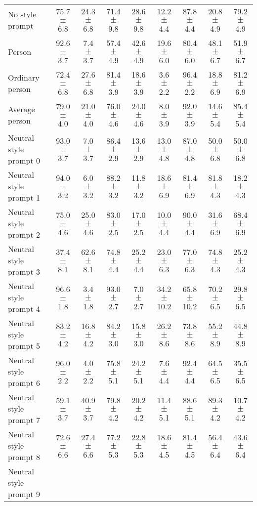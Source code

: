 \begin{table*}[p]
{\begin{tabular}{l|cc|cc|cc|cc}
No style prompt
& 75.7 $\pm$ 6.8 & 24.3 $\pm$ 6.8
& 71.4 $\pm$ 9.8 & 28.6 $\pm$ 9.8
& 12.2 $\pm$ 4.4 & 87.8 $\pm$ 4.4
& 20.8 $\pm$ 4.9 & 79.2 $\pm$ 4.9
\\
Person
& 92.6 $\pm$ 3.7 & 7.4 $\pm$ 3.7
& 57.4 $\pm$ 4.9 & 42.6 $\pm$ 4.9
& 19.6 $\pm$ 6.0 & 80.4 $\pm$ 6.0
& 48.1 $\pm$ 6.7 & 51.9 $\pm$ 6.7
\\
Ordinary person
& 72.4 $\pm$ 6.8 & 27.6 $\pm$ 6.8
& 81.4 $\pm$ 3.9 & 18.6 $\pm$ 3.9
& 3.6 $\pm$ 2.2 & 96.4 $\pm$ 2.2
& 18.8 $\pm$ 6.9 & 81.2 $\pm$ 6.9
\\
Average person
& 79.0 $\pm$ 4.0 & 21.0 $\pm$ 4.0
& 76.0 $\pm$ 4.6 & 24.0 $\pm$ 4.6
& 8.0 $\pm$ 3.9 & 92.0 $\pm$ 3.9
& 14.6 $\pm$ 5.4 & 85.4 $\pm$ 5.4
\\
Neutral style prompt 0
& 93.0 $\pm$ 3.7 & 7.0 $\pm$ 3.7
& 86.4 $\pm$ 2.9 & 13.6 $\pm$ 2.9
& 13.0 $\pm$ 4.8 & 87.0 $\pm$ 4.8
& 50.0 $\pm$ 6.8 & 50.0 $\pm$ 6.8
\\
Neutral style prompt 1
& 94.0 $\pm$ 3.2 & 6.0 $\pm$ 3.2
& 88.2 $\pm$ 3.2 & 11.8 $\pm$ 3.2
& 18.6 $\pm$ 6.9 & 81.4 $\pm$ 6.9
& 81.8 $\pm$ 4.3 & 18.2 $\pm$ 4.3
\\
Neutral style prompt 2
& 75.0 $\pm$ 4.6 & 25.0 $\pm$ 4.6
& 83.0 $\pm$ 2.5 & 17.0 $\pm$ 2.5
& 10.0 $\pm$ 4.4 & 90.0 $\pm$ 4.4
& 31.6 $\pm$ 6.9 & 68.4 $\pm$ 6.9
\\
Neutral style prompt 3
& 37.4 $\pm$ 8.1 & 62.6 $\pm$ 8.1
& 74.8 $\pm$ 4.4 & 25.2 $\pm$ 4.4
& 23.0 $\pm$ 6.3 & 77.0 $\pm$ 6.3
& 74.8 $\pm$ 4.3 & 25.2 $\pm$ 4.3
\\
Neutral style prompt 4
& 96.6 $\pm$ 1.8 & 3.4 $\pm$ 1.8
& 93.0 $\pm$ 2.7 & 7.0 $\pm$ 2.7
& 34.2 $\pm$ 10.2 & 65.8 $\pm$ 10.2
& 70.2 $\pm$ 6.5 & 29.8 $\pm$ 6.5
\\
Neutral style prompt 5
& 83.2 $\pm$ 4.2 & 16.8 $\pm$ 4.2
& 84.2 $\pm$ 3.0 & 15.8 $\pm$ 3.0
& 26.2 $\pm$ 8.6 & 73.8 $\pm$ 8.6
& 55.2 $\pm$ 8.9 & 44.8 $\pm$ 8.9
\\
Neutral style prompt 6
& 96.0 $\pm$ 2.2 & 4.0 $\pm$ 2.2
& 75.8 $\pm$ 5.1 & 24.2 $\pm$ 5.1
& 7.6 $\pm$ 4.4 & 92.4 $\pm$ 4.4
& 64.5 $\pm$ 6.5 & 35.5 $\pm$ 6.5
\\
Neutral style prompt 7
& 59.1 $\pm$ 3.7 & 40.9 $\pm$ 3.7
& 79.8 $\pm$ 4.2 & 20.2 $\pm$ 4.2
& 11.4 $\pm$ 5.1 & 88.6 $\pm$ 5.1
& 89.3 $\pm$ 4.2 & 10.7 $\pm$ 4.2
\\
Neutral style prompt 8
& 72.6 $\pm$ 6.6 & 27.4 $\pm$ 6.6
& 77.2 $\pm$ 5.3 & 22.8 $\pm$ 5.3
& 18.6 $\pm$ 4.5 & 81.4 $\pm$ 4.5
& 56.4 $\pm$ 6.4 & 43.6 $\pm$ 6.4
\\
Neutral style prompt 9

\end{tabular}}
\end{table*}
